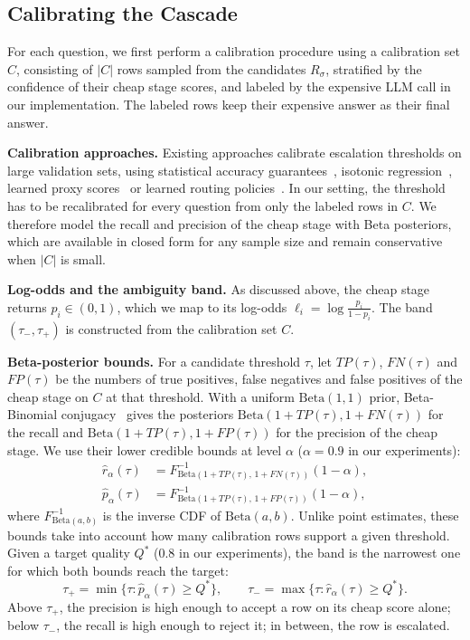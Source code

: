 \documentclass[sigconf]{acmart}
\begin{document}
\subsection{Calibrating the Cascade}
\label{sec:cascade-math}

For each question, we first perform a calibration procedure using a calibration set $C$, consisting of $|C|$ rows sampled from the candidates $R_\sigma$, stratified by the confidence of their cheap stage scores, and labeled by the expensive LLM call in our implementation. The labeled rows keep their expensive answer as their final answer.

\textbf{Calibration approaches.}
Existing approaches calibrate escalation thresholds on large validation sets, using statistical accuracy guarantees~\cite{zeighami2026bargain}, isotonic regression~\cite{kotte2026ucci}, learned proxy scores~\cite{zhang2025scaledoc} or learned routing policies~\cite{chen2023frugalgpt}. In our setting, the threshold has to be recalibrated for every question from only the labeled rows in $C$. We therefore model the recall and precision of the cheap stage with Beta posteriors, which are available in closed form for any sample size and remain conservative when $|C|$ is small.

\textbf{Log-odds and the ambiguity band.} As discussed above, the cheap stage returns $p_i \in (0,1)$, which we map to its log-odds $\ell_i = \log \frac{p_i}{1-p_i}$. The band $(\tau_-,\tau_+)$ is constructed from the calibration set $C$.

\textbf{Beta-posterior bounds.}
\label{sec:beta-posterior}
For a candidate threshold $\tau$, let $\mathit{TP}(\tau)$, $\mathit{FN}(\tau)$ and $\mathit{FP}(\tau)$ be the numbers of true positives, false negatives and false positives of the cheap stage on $C$ at that threshold. With a uniform $\mathrm{Beta}(1,1)$ prior, Beta-Binomial conjugacy~\cite{gelman2013bayesian} gives the posteriors $\mathrm{Beta}(1{+}\mathit{TP}(\tau), 1{+}\mathit{FN}(\tau))$ for the recall and $\mathrm{Beta}(1{+}\mathit{TP}(\tau), 1{+}\mathit{FP}(\tau))$ for the precision of the cheap stage. We use their lower credible bounds at level $\alpha$ ($\alpha{=}0.9$ in our experiments):
\begin{align*}
  \widehat r_\alpha(\tau) &= F^{-1}_{\mathrm{Beta}(1+\mathit{TP}(\tau),\,1+\mathit{FN}(\tau))}(1-\alpha),\\
  \widehat p_\alpha(\tau) &= F^{-1}_{\mathrm{Beta}(1+\mathit{TP}(\tau),\,1+\mathit{FP}(\tau))}(1-\alpha),
\end{align*}
where $F^{-1}_{\mathrm{Beta}(a,b)}$ is the inverse CDF of $\mathrm{Beta}(a,b)$. Unlike point estimates, these bounds take into account how many calibration rows support a given threshold. Given a target quality $Q^\ast$ ($0.8$ in our experiments), the band is the narrowest one for which both bounds reach the target:
\[
  \tau_+=\min\{\tau:\widehat p_\alpha(\tau)\ge Q^\ast\}, \qquad
  \tau_-=\max\{\tau:\widehat r_\alpha(\tau)\ge Q^\ast\}.
\]
Above $\tau_+$, the precision is high enough to accept a row on its cheap score alone; below $\tau_-$, the recall is high enough to reject it; in between, the row is escalated.
\end{document}
